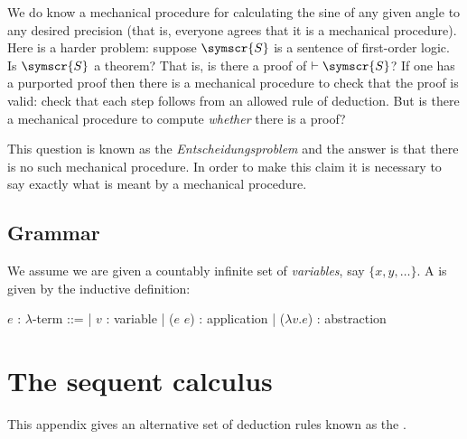\documentclass{article}
\newcommand{\wff}[1]{\ensuremath{\symscr{#1}}} %
\begin{document}
We do know a mechanical procedure for calculating the sine of any given angle to any desired precision (that is, everyone agrees that it is a mechanical procedure).  Here is a harder problem: suppose $\wff{S}$ is a sentence of first-order logic. Is $\wff{S}$ a theorem? That is, is there a proof of $\vdash \wff{S}$?  If one has a purported proof then there is a mechanical procedure to check that the proof is valid: check that each step follows from an allowed rule of deduction.  But is there a mechanical procedure to compute \emph{whether} there is a proof?

This question is known as the \emph{Entscheidungsproblem} and the answer is that there is no such mechanical procedure.  In order to make this claim it is necessary to say exactly what is meant by a mechanical procedure. 

\subsection{Grammar}

We assume we are given a countably infinite set of \emph{variables}, say $\{x, y, \dotsc \}$. A  is given by the inductive definition:
\begin{center}
  \begin{bnf}
    $e$ : $\lambda$-term ::= 
    | $v$ : variable
    | ($e$ $e$) : application
    | ($\lambda v. e$) : abstraction
  \end{bnf}
\end{center}




\newpage
\appendix
\section{The sequent calculus}

This appendix gives an alternative set of deduction rules known as the .
\end{document}
